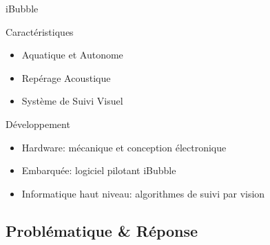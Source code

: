 \documentclass{bredelebeamer}
\begin{document}
\begin{frame}{iBubble}

\begin{block}{Caractéristiques}
\begin{itemize}
\item Aquatique et Autonome
\item Repérage Acoustique
\item Système de Suivi Visuel
\end{itemize}
\end{block}

\begin{block}{Développement}
\begin{itemize}
\item Hardware: mécanique et conception électronique
\item Embarquée: logiciel pilotant iBubble
\item Informatique haut niveau: algorithmes de suivi par vision
\end{itemize}
\end{block}

\end{frame}



	\subsection{Problématique \& Réponse}

\end{document}
